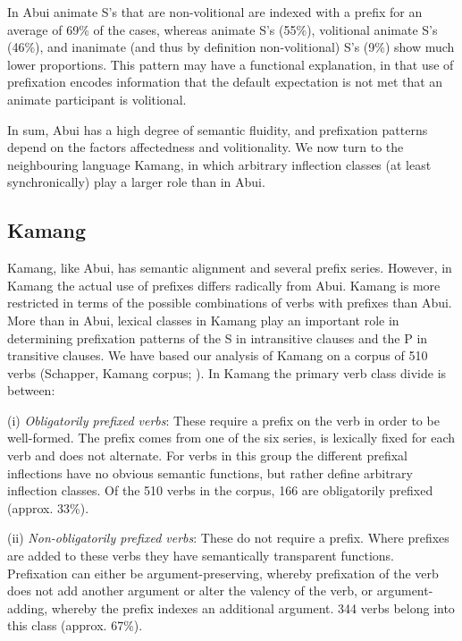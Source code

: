In Abui animate S's that are non-volitional are indexed with a prefix for an average of 69\% of the cases, whereas animate S's (55\%), volitional animate S's (46\%), and inanimate (and thus by definition non-volitional) S's (9\%) show much lower proportions. This pattern may have a functional explanation, in that use of prefixation encodes information that the default expectation is not met that an animate participant is volitional.

In sum, Abui has a high degree of semantic fluidity, and prefixation patterns depend on the factors affectedness and volitionality. We now turn to the neighbouring language Kamang, in which arbitrary inflection classes (at least synchronically) play a larger role than in Abui.
 

\subsection{Kamang}

\label{sec:10:5.2}
Kamang, like Abui, has semantic alignment and several prefix series. However, in Kamang the actual use of prefixes differs radically from Abui. Kamang is more restricted in terms of the possible combinations of verbs with prefixes than Abui. More than in Abui, lexical classes in Kamang play an important role in determining prefixation patterns of the S in intransitive clauses and the P in transitive clauses. We have based our analysis of Kamang on a corpus of 510 verbs (Schapper, Kamang corpus; \citet{SchapperEtAl2011kamus}). In Kamang the primary verb class divide is between:
\newpage

(i)  \textit{Obligatorily prefixed verbs}: These require a prefix on the verb in order to be well-formed. The prefix comes from one of the six series, is lexically fixed for each verb and does not alternate. For verbs in this group the different prefixal inflections have no obvious semantic functions, but rather define arbitrary inflection classes. Of the 510 verbs in the corpus, 166 are obligatorily prefixed (approx. 33\%).

(ii) \textit{Non-obligatorily prefixed verbs}: These do not require a prefix. Where prefixes are added to these verbs they have semantically transparent functions. Prefixation can either be argument-preserving, whereby prefixation of the verb does not add another argument or alter the valency of the verb, or argument-adding, whereby the prefix indexes an additional argument. 344 verbs belong into this class (approx. 67\%).

